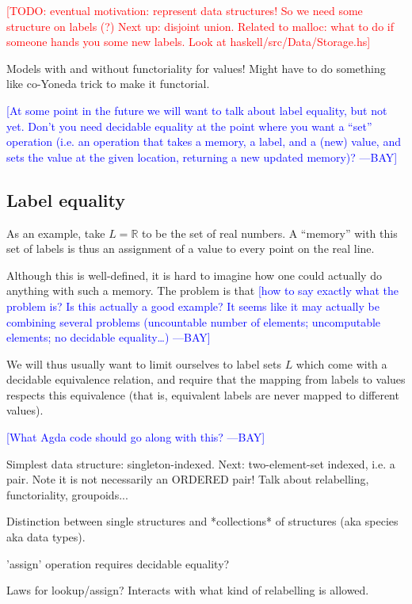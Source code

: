 \documentclass{jfp1}
\newcommand{\authornote}[3]{\textcolor{#1}{[#3 ---#2]}}
\newcommand{\todo}[1]{\textcolor{red}{[TODO: #1]}}
\newcommand{\authornote}[3]{}
\newcommand{\todo}[1]{}
\newcommand{\bay}[1]{\authornote{blue}{BAY}{#1}}
\begin{document}
\todo{eventual motivation: represent data structures!  So we need some
structure on labels (?)  Next up: disjoint union.  Related to malloc:
what to do if someone hands you some new labels.  Look at haskell/src/Data/Storage.hs}

\begin{commentary}
  Models with and without functoriality for values!  Might have to do
  something like co-Yoneda trick to make it functorial.
\end{commentary}

\bay{At some point in the future we will want to talk about label
  equality, but not yet.  Don't you need decidable equality at the
  point where you want a ``set'' operation (i.e. an operation that
  takes a memory, a label, and a (new) value, and sets the value at
  the given location, returning a new updated memory)?}

\subsection{Label equality}
\label{sec:label-equality}

As an example, take $L = \mathbb{R}$ to be the set of real numbers.
A ``memory'' with this set of labels is thus an assignment of a value
to every point on the real line.

Although this is well-defined, it is hard to imagine how one could
actually do anything with such a memory.  The problem is that
\bay{how to say exactly what the problem is?  Is this actually a good
  example?  It seems like it may actually be combining several
  problems (uncountable number of elements; uncomputable elements; no
  decidable equality\dots)}

We will thus usually want to limit ourselves to label sets $L$ which
come with a decidable equivalence relation, and require that the
mapping from labels to values respects this equivalence (that is,
equivalent labels are never mapped to different values).

\bay{What Agda code should go along with this?}


\begin{commentary}
  Simplest data structure: singleton-indexed.  Next: two-element-set
  indexed, i.e. a pair.  Note it is not necessarily an ORDERED pair!
  Talk about relabelling, functoriality, groupoids...

  Distinction between single structures and *collections* of
  structures (aka species aka data types).

  'assign' operation requires decidable equality?

  Laws for lookup/assign?  Interacts with what kind of relabelling is
  allowed.

\end{commentary}
\end{document}
